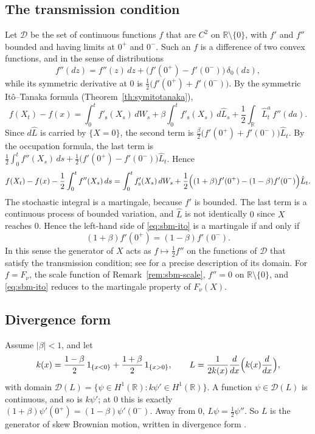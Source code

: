 \subsection{The transmission condition}
Let $\mathcal{D}$ be the set of continuous functions $f$ that are $C^2$ on
$\mathbb{R}\setminus\{0\}$, with $f'$ and $f''$ bounded and having limits at
$0^+$ and $0^-$. Such an $f$ is a difference of two convex functions, and in
the sense of distributions
\[
	f''(dz) = f''(z)\,dz + \bigl(f'(0^+) - f'(0^-)\bigr)\,\delta_0(dz),
\]
while its symmetric derivative at $0$ is $\frac{1}{2}\bigl(f'(0^+)+f'(0^-)\bigr)$.
By the symmetric Itô--Tanaka formula (Theorem~\ref{th:symitotanaka}),
\[
	f(X_t) - f(x) = \int_0^t f'_{\mathrm{s}}(X_s)\,dW_s
	+ \beta\int_0^t f'_{\mathrm{s}}(X_s)\,d\hat{L}_s
	+ \frac{1}{2}\int_{\mathbb{R}}\hat{L}^a_t\,f''(da) .
\]
Since $d\hat{L}$ is carried by $\{X = 0\}$, the second term is
$\frac{\beta}{2}\bigl(f'(0^+)+f'(0^-)\bigr)\hat{L}_t$. By the occupation
formula, the last term is
$\frac{1}{2}\int_0^tf''(X_s)\,ds + \frac{1}{2}\bigl(f'(0^+)-f'(0^-)\bigr)\hat{L}_t$.
Hence
\begin{equation}\label{eq:sbm-ito}
	f(X_t) - f(x) - \frac{1}{2}\int_0^tf''(X_s)\,ds
	= \int_0^tf'_{\mathrm{s}}(X_s)\,dW_s
	+ \frac{1}{2}\Bigl((1+\beta)f'(0^+) - (1-\beta)f'(0^-)\Bigr)\hat{L}_t .
\end{equation}
The stochastic integral is a martingale, because $f'$ is bounded. The last
term is a continuous process of bounded variation, and $\hat{L}$ is not
identically $0$ since $X$ reaches $0$. Hence the left-hand side of
\eqref{eq:sbm-ito} is a martingale if and only if
\[
	(1+\beta)f'(0^+) = (1-\beta)f'(0^-).
\]
In this sense the generator of $X$ acts as $f\mapsto\frac{1}{2}f''$ on the
functions of $\mathcal{D}$ that satisfy the transmission condition; see
\citet{Lejay2006} for a precise description of its domain. For $f = F_\nu$,
the scale function of Remark~\ref{rem:sbm-scale}, $f'' = 0$ on
$\mathbb{R}\setminus\{0\}$, and \eqref{eq:sbm-ito} reduces to the martingale
property of $F_\nu(X)$.

\subsection{Divergence form}
Assume $|\beta|<1$, and let
\[
	k(x) = \frac{1-\beta}{2}\,1_{\{x<0\}} + \frac{1+\beta}{2}\,1_{\{x>0\}},
	\qquad
	L = \frac{1}{2k(x)}\frac{d}{dx}\Bigl(k(x)\frac{d}{dx}\Bigr),
\]
with domain
$\mathcal{D}(L) = \{\psi\in H^1(\mathbb{R}) : k\psi'\in H^1(\mathbb{R})\}$.
A function $\psi\in\mathcal{D}(L)$ is continuous, and so is $k\psi'$; at $0$
this is exactly $(1+\beta)\psi'(0^+) = (1-\beta)\psi'(0^-)$. Away from $0$,
$L\psi = \frac{1}{2}\psi''$. So $L$ is the generator of skew Brownian motion,
written in divergence form \citep{Lejay2006}.


